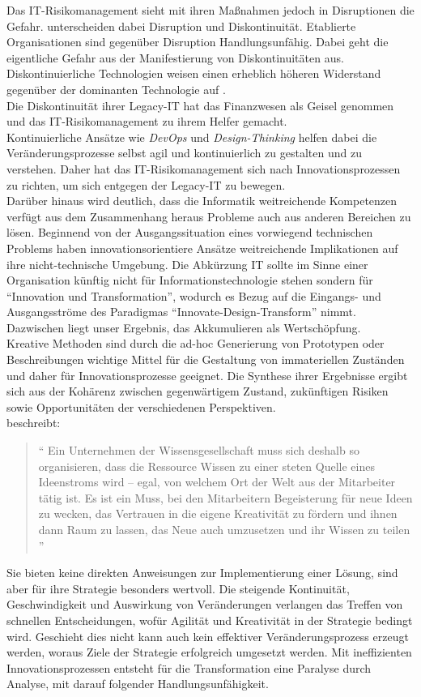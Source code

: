 Das IT-Risikomanagement sieht mit ihren Maßnahmen jedoch in Disruptionen die Gefahr. \citet{Fernandez:2020} unterscheiden dabei Disruption und Diskontinuität. Etablierte Organisationen sind gegenüber Disruption Handlungsunfähig. Dabei geht die eigentliche Gefahr aus der Manifestierung von Diskontinuitäten aus. Diskontinuierliche Technologien weisen einen erheblich höheren Widerstand gegenüber der dominanten Technologie auf \cite{Fernandez:2020}. 
\medskip
\\
Die Diskontinuität ihrer Legacy-IT hat das Finanzwesen als Geisel genommen und das IT-Risikomanagement zu ihrem Helfer gemacht.
\medskip
\\
Kontinuierliche Ansätze wie \emph{DevOps} und \emph{Design-Thinking} helfen dabei die Veränderungsprozesse selbst agil und kontinuierlich zu gestalten und zu verstehen. Daher hat das IT-Risikomanagement sich nach Innovationsprozessen zu richten, um sich entgegen der Legacy-IT zu bewegen.
\medskip
\\
Darüber hinaus wird deutlich, dass die Informatik weitreichende Kompetenzen verfügt aus dem Zusammenhang heraus Probleme auch aus anderen Bereichen zu lösen. Beginnend von der Ausgangssituation eines vorwiegend technischen Problems haben innovationsorientiere Ansätze weitreichende Implikationen auf ihre nicht-technische Umgebung. Die Abkürzung IT sollte im Sinne einer Organisation künftig nicht für Informationstechnologie stehen sondern für \enquote{Innovation und Transformation}, wodurch es Bezug auf die Eingangs- und Ausgangsströme des Paradigmas \enquote{Innovate-Design-Transform} nimmt. Dazwischen liegt unser Ergebnis, das Akkumulieren als Wertschöpfung.
\medskip
\\
Kreative Methoden sind durch die ad-hoc Generierung von Prototypen oder Beschreibungen wichtige Mittel für die Gestaltung von immateriellen Zuständen und daher für Innovationsprozesse geeignet. Die Synthese ihrer Ergebnisse ergibt sich aus der Kohärenz zwischen gegenwärtigem Zustand, zukünftigen Risiken sowie Opportunitäten der verschiedenen Perspektiven. 
\medskip
\\
\citet{Ganswindt2006} beschreibt:
\begin{quote}
    \enquote{
    Ein Unternehmen der Wissensgesellschaft muss sich deshalb so organisieren, dass die Ressource Wissen zu einer steten Quelle eines Ideenstroms wird – egal, von welchem Ort der Welt aus der Mitarbeiter tätig ist. Es ist ein Muss, bei den Mitarbeitern Begeisterung für neue Ideen zu wecken, das Vertrauen in die eigene Kreativität zu fördern und ihnen dann Raum zu lassen, das Neue auch umzusetzen und ihr Wissen zu teilen
    }
\end{quote}
\medskip
Sie bieten keine direkten Anweisungen zur Implementierung einer Lösung, sind aber für ihre Strategie besonders wertvoll. Die steigende Kontinuität, Geschwindigkeit und Auswirkung von Veränderungen verlangen das Treffen von schnellen Entscheidungen, wofür Agilität und Kreativität in der Strategie bedingt wird. Geschieht dies nicht kann auch kein effektiver Veränderungsprozess erzeugt werden, woraus Ziele der Strategie erfolgreich umgesetzt werden. Mit ineffizienten Innovationsprozessen entsteht für die Transformation eine Paralyse durch Analyse, mit darauf folgender Handlungsunfähigkeit. 

